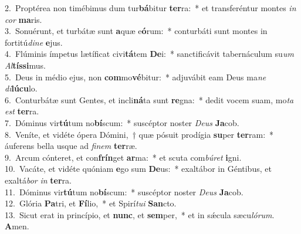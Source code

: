 {2.~}Proptérea non timébimus dum tur\textbf{bá}bitur \textbf{ter}ra:~* et transferéntur montes \textit{in} \textit{cor} \textbf{ma}ris.\\
{3.~}Sonuérunt, et turbátæ sunt \textbf{a}quæ e\textbf{ó}rum:~* conturbáti sunt montes in fortitú\textit{di}\textit{ne} \textbf{e}jus.\\
{4.~}Flúminis ímpetus lætíficat civi\textbf{tá}tem \textbf{De}i:~* sanctificávit tabernáculum su\textit{um} \textit{Al}\textbf{tís}\textbf{si}mus.\\
{5.~}Deus in médio ejus, non \textbf{com}mo\textbf{vé}bitur:~* adjuvábit eam Deus ma\textit{ne} \textit{di}\textbf{lú}\textbf{cu}lo.\\
{6.~}Conturbátæ sunt Gentes, et incli\textbf{ná}ta sunt \textbf{re}gna:~* dedit vocem suam, mo\textit{ta} \textit{est} \textbf{ter}ra.\\
{7.~}Dóminus vir\textbf{tú}tum no\textbf{bí}scum:~* suscéptor noster \textit{De}\textit{us} \textbf{Ja}cob.\\
{8.~}Veníte, et vidéte ópera Dómini,~† quæ pósuit prodígia \textbf{su}per \textbf{ter}ram:~* áuferens bella usque ad \textit{fi}\textit{nem} \textbf{ter}ræ.\\
{9.~}Arcum cónteret, et con\textbf{frín}get \textbf{ar}ma:~* et scuta com\textit{bú}\textit{ret} \textbf{i}gni.\\
{10.~}Vacáte, et vidéte quóniam \textbf{e}go sum \textbf{De}us:~* exaltábor in Géntibus, et exaltá\textit{bor} \textit{in} \textbf{ter}ra.\\
{11.~}Dóminus vir\textbf{tú}tum no\textbf{bí}scum:~* suscéptor noster \textit{De}\textit{us} \textbf{Ja}cob.\\
{12.~}Glória \textbf{Pa}tri, et \textbf{Fí}lio,~* et Spirí\textit{tu}\textit{i} \textbf{San}cto.\\
{13.~}Sicut erat in princípio, et \textbf{nunc}, et \textbf{sem}per,~* et in sǽcula sæcu\textit{ló}\textit{rum}. \textbf{A}men.\\
